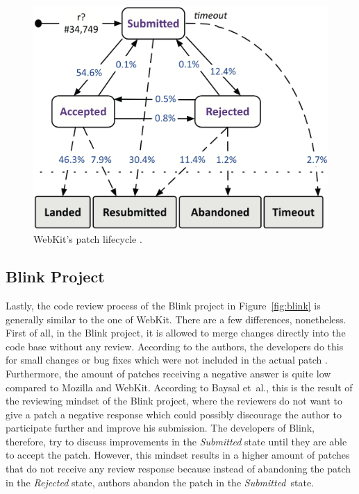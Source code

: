 \documentclass[conference]{IEEEtran}
\begin{document}
\begin{figure}
    \centering
    \includegraphics[scale=0.25]{img/webkit.png}
    \caption{WebKit's patch lifecycle \cite{baysal2015synthesizing}.}
    \label{fig:webkit}
\end{figure}

\subsection{Blink Project}

Lastly, the code review process of the Blink project in Figure~\ref{fig:blink} is generally similar to the one of WebKit. There are a few differences, nonetheless. First of all, in the Blink project, it is allowed to merge changes directly into the code base without any review. According to the authors, the developers do this for small changes or bug fixes which were not included in the actual patch \cite{baysal2015synthesizing}. Furthermore, the amount of patches receiving a negative answer is quite low compared to Mozilla and WebKit. According to Baysal et~al.\cite{baysal2015synthesizing}, this is the result of the reviewing mindset of the Blink project, where the reviewers do not want to give a patch a negative response which could possibly discourage the author to participate further and improve his submission. The developers of Blink, therefore, try to discuss improvements in the \textit{Submitted} state until they are able to accept the patch. However, this mindset results in a higher amount of patches that do not receive any review response because instead of abandoning the patch in the \textit{Rejected} state, authors abandon the patch in the \textit{Submitted}~state.
\end{document}
